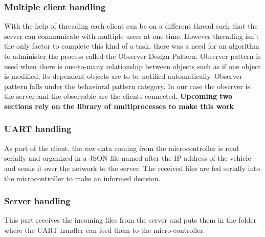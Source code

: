 \subsubsection{Multiple client handling}
With the help of threading each client can be on a different thread such that the server can communicate with multiple users at one time. However threading isn't the only factor to complete this kind of a task, there was a need for an algorithm to administer the process called the Observer Design Pattern. Observer pattern is used when there is one-to-many relationship between objects such as if one object is modified, its dependent objects are to be notified automatically. Observer pattern falls under the behavioral pattern category. In our case the observer is the server and the observable are the clients connected.
\newline\newline
\textbf{Upcoming two sections rely on the library of multiprocesses to make this work}

\subsubsection{UART handling}
As part of the client, the raw data coming from the microcontroller is read serially and organized in a JSON file named after the IP address of the vehicle and sends it over the network to the server. The received files are fed serially into the microcontroller to make an informed decision.

\subsubsection{Server handling}
This part receives the incoming files from the server and puts them in the folder where the UART handler can feed them to the micro-controller.